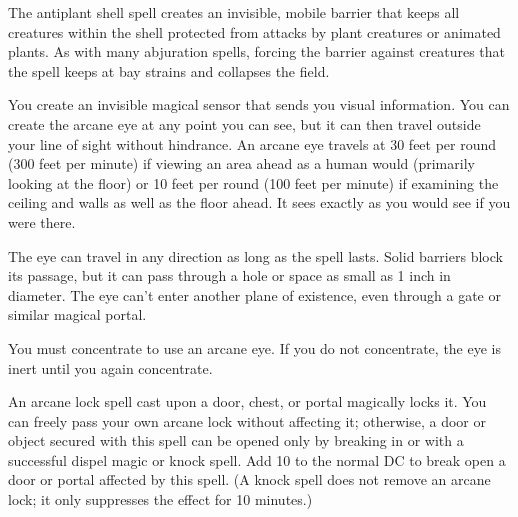 \begin{multicols}{2}
\begin{small}

\noindent The antiplant shell spell creates an invisible, mobile barrier that keeps all creatures within the shell protected from attacks by plant creatures or animated plants. As with many abjuration spells, forcing the barrier against creatures that the spell keeps at bay strains and collapses the field.

\noindent You create an invisible magical sensor that sends you visual information. You can create the arcane eye at any point you can see, but it can then travel outside your line of sight without hindrance. An arcane eye travels at 30 feet per round (300 feet per minute) if viewing an area ahead as a human would (primarily looking at the floor) or 10 feet per round (100 feet per minute) if examining the ceiling and walls as well as the floor ahead. It sees exactly as you would see if you were there.

\smallskip\noindent The eye can travel in any direction as long as the spell lasts. Solid barriers block its passage, but it can pass through a hole or space as small as 1 inch in diameter. The eye can't enter another plane of existence, even through a gate or similar magical portal.

\smallskip\noindent You must concentrate to use an arcane eye. If you do not concentrate, the eye is inert until you again concentrate.


\noindent An arcane lock spell cast upon a door, chest, or portal magically locks it. You can freely pass your own arcane lock without affecting it; otherwise, a door or object secured with this spell can be opened only by breaking in or with a successful dispel magic or knock spell. Add 10 to the normal DC to break open a door or portal affected by this spell. (A knock spell does not remove an arcane lock; it only suppresses the effect for 10 minutes.)


\end{small}
\end{multicols}

